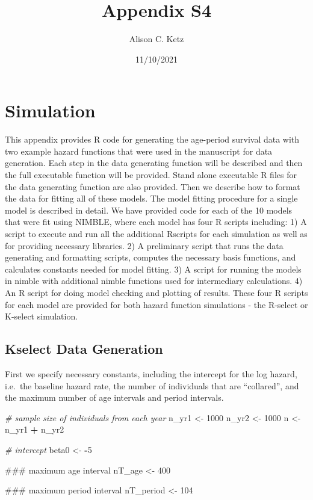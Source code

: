 \documentclass[11pt,]{article}
\title{Appendix S4}
\author{Alison C. Ketz}
\date{11/10/2021}
\newenvironment{Shaded}{\begin{snugshade}}{\end{snugshade}}
\newcommand{\DecValTok}[1]{\textcolor[rgb]{0.00,0.00,0.81}{#1}}
\newcommand{\StringTok}[1]{\textcolor[rgb]{0.31,0.60,0.02}{#1}}
\newcommand{\CommentTok}[1]{\textcolor[rgb]{0.56,0.35,0.01}{\textit{#1}}}
\newcommand{\OperatorTok}[1]{\textcolor[rgb]{0.81,0.36,0.00}{\textbf{#1}}}
\newcommand{\NormalTok}[1]{#1}
\begin{document}
\maketitle

\section{Simulation}\label{simulation}

This appendix provides R code for generating the age-period survival
data with two example hazard functions that were used in the manuscript
for data generation. Each step in the data generating function will be
described and then the full executable function will be provided. Stand
alone executable R files for the data generating function are also
provided. Then we describe how to format the data for fitting all of
these models. The model fitting procedure for a single model is
described in detail. We have provided code for each of the 10 models
that were fit using NIMBLE, where each model has four R scripts
including: 1) A script to execute and run all the additional Rscripts
for each simulation as well as for providing necessary libraries. 2) A
preliminary script that runs the data generating and formatting scripts,
computes the necessary basis functions, and calculates constants needed
for model fitting. 3) A script for running the models in nimble with
additional nimble functions used for intermediary calculations. 4) An R
script for doing model checking and plotting of results. These four R
scripts for each model are provided for both hazard function simulations
- the R-select or K-select simulation.

\subsection{Kselect Data Generation}\label{kselect-data-generation}

First we specify necessary constants, including the intercept for the
log hazard, i.e.~the baseline hazard rate, the number of individuals
that are ``collared'', and the maximum number of age intervals and
period intervals.

\begin{Shaded}
\begin{Highlighting}[]
  \CommentTok{# sample size of individuals from each year}
\NormalTok{  n_yr1 <-}\StringTok{ }\DecValTok{1000}
\NormalTok{  n_yr2 <-}\StringTok{ }\DecValTok{1000}
\NormalTok{  n <-}\StringTok{ }\NormalTok{n_yr1 }\OperatorTok{+}\StringTok{ }\NormalTok{n_yr2}
  
  \CommentTok{# intercept}
\NormalTok{  beta0 <-}\StringTok{ }\OperatorTok{-}\DecValTok{5}

\NormalTok{  ### maximum age interval}
\NormalTok{  nT_age <-}\StringTok{ }\DecValTok{400}

\NormalTok{  ### maximum period interval}
\NormalTok{  nT_period <-}\StringTok{ }\DecValTok{104}
\end{Highlighting}
\end{Shaded}
\end{document}
